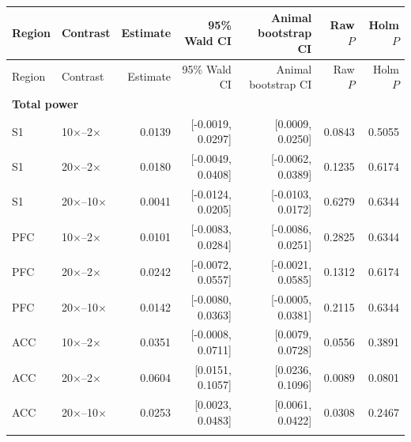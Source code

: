 \begin{longtable}{llrrrrr}
\toprule
Region & Contrast & Estimate & 95\% Wald CI & Animal bootstrap CI & Raw $P$ & Holm $P$ \\
\midrule
\endfirsthead
\toprule
Region & Contrast & Estimate & 95\% Wald CI & Animal bootstrap CI & Raw $P$ & Holm $P$ \\
\midrule
\endhead
\multicolumn{7}{l}{\textbf{Total power}} \\
S1 & 10$\times$--2$\times$ & 0.0139 & [-0.0019, 0.0297] & [0.0009, 0.0250] & 0.0843 & 0.5055 \\
S1 & 20$\times$--2$\times$ & 0.0180 & [-0.0049, 0.0408] & [-0.0062, 0.0389] & 0.1235 & 0.6174 \\
S1 & 20$\times$--10$\times$ & 0.0041 & [-0.0124, 0.0205] & [-0.0103, 0.0172] & 0.6279 & 0.6344 \\
PFC & 10$\times$--2$\times$ & 0.0101 & [-0.0083, 0.0284] & [-0.0086, 0.0251] & 0.2825 & 0.6344 \\
PFC & 20$\times$--2$\times$ & 0.0242 & [-0.0072, 0.0557] & [-0.0021, 0.0585] & 0.1312 & 0.6174 \\
PFC & 20$\times$--10$\times$ & 0.0142 & [-0.0080, 0.0363] & [-0.0005, 0.0381] & 0.2115 & 0.6344 \\
ACC & 10$\times$--2$\times$ & 0.0351 & [-0.0008, 0.0711] & [0.0079, 0.0728] & 0.0556 & 0.3891 \\
ACC & 20$\times$--2$\times$ & 0.0604 & [0.0151, 0.1057] & [0.0236, 0.1096] & 0.0089 & 0.0801 \\
ACC & 20$\times$--10$\times$ & 0.0253 & [0.0023, 0.0483] & [0.0061, 0.0422] & 0.0308 & 0.2467 \\
\addlinespace
\bottomrule
\end{longtable}
